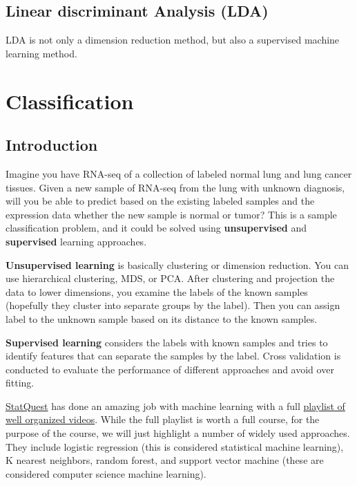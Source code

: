 \documentclass[
]{book}
\begin{document}
\hypertarget{linear-discriminant-analysis-lda}{%
\section{Linear discriminant Analysis (LDA)}\label{linear-discriminant-analysis-lda}}

LDA is not only a dimension reduction method, but also a supervised machine learning method.

\hypertarget{ml}{%
\chapter{Classification}\label{ml}}

\hypertarget{introduction-1}{%
\section{Introduction}\label{introduction-1}}

Imagine you have RNA-seq of a collection of labeled normal lung and lung cancer tissues. Given a new sample of RNA-seq from the lung with unknown diagnosis, will you be able to predict based on the existing labeled samples and the expression data whether the new sample is normal or tumor? This is a sample classification problem, and it could be solved using \textbf{unsupervised} and \textbf{supervised} learning approaches.

\textbf{Unsupervised learning} is basically clustering or dimension reduction. You can use hierarchical clustering, MDS, or PCA. After clustering and projection the data to lower dimensions, you examine the labels of the known samples (hopefully they cluster into separate groups by the label). Then you can assign label to the unknown sample based on its distance to the known samples.

\textbf{Supervised learning} considers the labels with known samples and tries to identify features that can separate the samples by the label. Cross validation is conducted to evaluate the performance of different approaches and avoid over fitting.

\href{https://statquest.org/video-index/}{StatQuest} has done an amazing job with machine learning with a full \href{https://youtube.com/playlist?list=PLblh5JKOoLUICTaGLRoHQDuF_7q2GfuJF}{playlist of well organized videos}. While the full playlist is worth a full course, for the purpose of the course, we will just highlight a number of widely used approaches. They include logistic regression (this is considered statistical machine learning), K nearest neighbors, random forest, and support vector machine (these are considered computer science machine learning).
\end{document}
